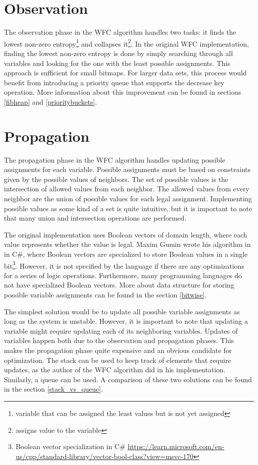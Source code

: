 \documentclass[shortabstract, english, inz]{iithesis}
\begin{document}
\section{Observation}
The observation phase in the WFC algorithm handles two tasks: it finds the lowest non-zero entropy\footnote{variable that can be assigned the least values but is not yet assigned} and collapses it\footnote{assigns value to the variable}.
In the original WFC implementation, finding the lowest non-zero entropy is done by simply searching through all variables and looking for the one with the least possible assignments. \cite{MaximGumin} This approach is sufficient for small bitmaps. For larger data sets, this process would benefit from introducing a priority queue that supports the decrease key operation.
 More information about this improvement can be found in sections \ref{fibheap} and \ref{prioritybuckets}.

\section{Propagation}
The propagation phase in the WFC algorithm handles updating possible assignments for each variable. Possible assignments must be based on constraints given by the possible values of neighbors. The set of possible values is the intersection of allowed values from each neighbor. The allowed values from every neighbor are the union of possible values for each legal assignment. Implementing possible values as some kind of a set is quite intuitive, but it is important to note that many union and intersection operations are performed.

The original implementation uses Boolean vectors of domain length, where each value represents whether the value is legal. Maxim Gumin wrote his algorithm in in C\#, where Boolean vectors are specialized to store Boolean values in a single bit\footnote{Boolean vector specialization in C\# \url{https://learn.microsoft.com/en-us/cpp/standard-library/vector-bool-class?view=msvc-170}}. However, it is not specified by the language if there are any optimizations for a series of logic operations. Furthermore, many programming languages do not have specialized Boolean vectors. More about data structure for storing possible variable assignments can be found in the section \ref{bitwise}.

\break\break
The simplest solution would be to update all possible variable assignments as long as the system is unstable. However, it is important to note that updating a variable might require updating each of its neighboring variables. Updates of variables happen both due to the observation and propagation phases. This makes the propagation phase quite expensive and an obvious candidate for optimization. The stack can be used to keep track of elements that require updates, as the author of the WFC algorithm did in his implementation. Similarly, a queue can be used. A comparison of these two solutions can be found in the section \ref{stack_vs_queue}.
\end{document}
